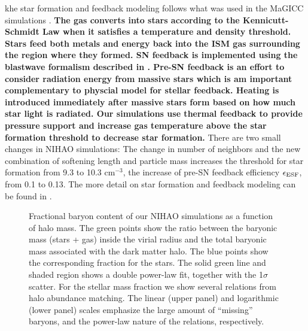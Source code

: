 \documentclass[useAMS,usenatbib]{mn2e}
\begin{document}
khe star formation and feedback modeling follows what
was used in the MaGICC simulations \citep{Stinson13}.  
{\bf The gas converts into stars according to the Kennicutt-Schmidt Law
when it satisfies a temperature and density threshold. Stars feed both
metals and energy back into the ISM gas surrounding the region where
they formed. SN feedback is implemented using the blastwave formalism
described in \citet{Stinson06}. Pre-SN feedback is an effort to consider
radiation energy from massive stars which is am important complementary
to physcial model for stellar feedback. Heating is introduced immediately
after massive stars form based on how much star light is radiated. 
Our simulations use thermal feedback to provide pressure support and 
increase gas temperature above the star formation threshold to
decrease star formation.}
There are two
small changes in NIHAO simulations: The change in  number of neighbors
and the new combination of softening length and  particle mass increases
the threshold for star formation from  9.3 to 10.3
cm$^{-3}$, the increase of pre-SN feedback efficiency $\epsilon_{\rm
  ESF}$, from 0.1 to 0.13.  The more detail on star formation and
feedback modeling can be found in \citet{Wang15}.





\begin{figure}
\centerline{
}
\caption{Fractional baryon content of our NIHAO simulations  as a
  function of halo mass. The green points show the ratio between the
  baryonic mass (stars + gas) inside the virial radius and the total
  baryonic mass associated with the dark matter halo. The blue points
  show the corresponding fraction for the stars. The solid green line
  and shaded region shows a double power-law fit, together with the
  1$\sigma$ scatter. For the stellar mass fraction we show several
  relations from halo abundance matching.    The linear (upper panel)
  and logarithmic (lower panel) scales emphasize the large amount of
  ``missing'' baryons, and the power-law nature of the relations,
  respectively.}
\label{fig:budget}
\end{figure}
\end{document}
